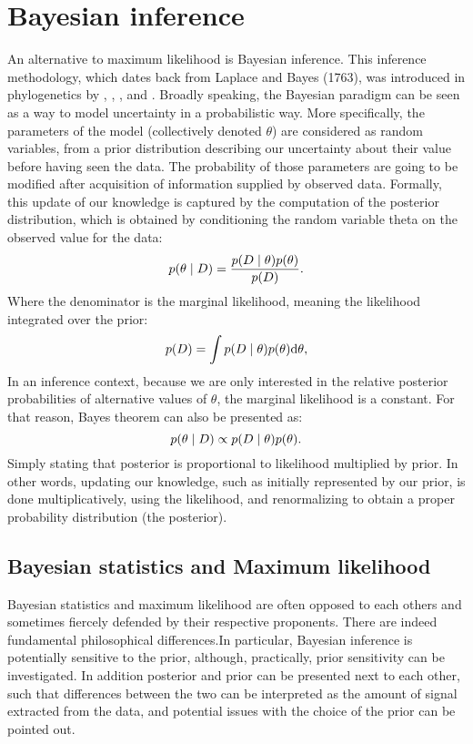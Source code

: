 \section{Bayesian inference}
\label{sec:intro-bayesian}

An alternative to maximum likelihood is Bayesian inference.
This inference methodology, which dates back from Laplace and Bayes (1763), was introduced in phylogenetics by \citet{Yang1997}, \citet{Mau1999}, \citet{Larget1999}, \citet{Li2000} and \citet{Huelsenbeck2001}.
Broadly speaking, the Bayesian paradigm can be seen as a way to model uncertainty in a probabilistic way.
More specifically, the parameters of the model (collectively denoted $\theta$) are considered as random variables, from a prior distribution describing our uncertainty about their value before having seen the data.
The probability of those parameters are going to be modified after acquisition of information supplied by observed data.
Formally, this update of our knowledge is captured by the computation of the posterior distribution, which is obtained by conditioning the random variable theta on the observed value for the data:
\begin{equation}
    p(\theta \mid D)=\frac{p(D \mid \theta)p(\theta)}{p(D)}.
\end{equation}
Where the denominator is the marginal likelihood, meaning the likelihood integrated over the prior:
\begin{equation}
    p(D) = \int p(D \mid \theta) p(\theta) \mathrm{d} \theta,
\end{equation}
In an inference context, because we are only interested in the relative posterior probabilities of alternative values of $\theta$, the marginal likelihood is a constant.
For that reason, Bayes theorem can also be presented as:
\begin{equation}
    p(\theta \mid D) \propto p(D \mid \theta)p(\theta).
\end{equation}
Simply stating that \gls{posterior} is proportional to \gls{likelihood} multiplied by \gls{prior}.
In other words, updating our knowledge, such as initially represented by our prior, is done multiplicatively, using the likelihood, and renormalizing to obtain a proper probability distribution (the posterior).

\subsection{Bayesian statistics and {Maximum likelihood}}
Bayesian statistics and maximum \gls{likelihood} are often opposed to each others and sometimes fiercely defended by their respective proponents.
There are indeed fundamental philosophical differences.In particular, Bayesian inference is potentially sensitive to the prior, although, practically, prior sensitivity can be investigated.
In addition posterior and prior can be presented next to each other, such that differences between the two can be interpreted as the amount of signal extracted from the data, and potential issues with the choice of the prior can be pointed out.

